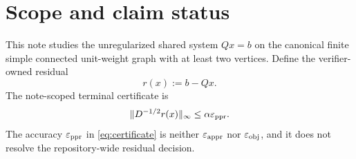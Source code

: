 \documentclass[11pt]{article}
\begin{document}
\begin{abstract}
An instrumented prototype confirms the distinction. Exact frontier-sparse CG
is certified on paths, stars, trees, spiders, and random regular graphs.
Restart-after-every-expansion is between $1.6$ and $23.4$ times more expensive
on the tested instances. Factor-two geometric envelopes reduce its work by
$10.8$ times on the path and $9.1$ times on the long spider, but still cost
$2.1$ and $2.6$ times frontier-sparse CG and overshoot the path envelope.
The promising research target is therefore exact frontier-sparse CG as a new
baseline. Geometric-envelope CG is useful only behind an explicit volume or
degree-overshoot guard. For the literal factor-two policy, a graph-uniform
$\widetilde O(1/(\epsppr\sqrt\alpha))$ theorem is refuted, not merely open.
\end{abstract}

\tableofcontents

\section{Scope and claim status}
\label{sec:scope}



This note studies the unregularized shared system $Qx=b$ on the canonical
finite simple connected unit-weight graph with at least two vertices. Define
the verifier-owned
residual
\begin{equation}
 r(x):=b-Qx.
 \label{eq:residual}
\end{equation}
The note-scoped terminal certificate is
\begin{equation}
 \lVert D^{-1/2}r(x)\rVert_\infty\leq\alpha\varepsilon_{\mathrm{ppr}}.
 \label{eq:certificate}
\end{equation}
The accuracy $\varepsilon_{\mathrm{ppr}}$ in \cref{eq:certificate} is neither $\varepsilon_{\mathrm{appr}}$ nor
$\varepsilon_{\mathrm{obj}}$, and it does not resolve the repository-wide residual decision.
\end{document}
